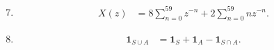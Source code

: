 \begin{enumerate}[label=\thesubsection.\arabic*, ref=\thesubsection.\theenumi, leftmargin=12mm, itemsep=4pt]
    \setcounter{enumi}{6}
    \item[\ref{question-short:C10-Q22}]
    \begin{align}
        X(z) &= 8\sum_{n=0}^{59} z^{-n}
        + 2\sum_{n=0}^{59} n z^{-n}.
        \label{formula:C10-Q22}
    \end{align}

    \setcounter{enumi}{7}
    \item[\ref{question-short:C10-Q28}]
    \begin{align}
        \mathbf 1_{S\cup A}
        &= \mathbf 1_S+\mathbf 1_A-\mathbf 1_{S\cap A}.
        \label{formula:C10-Q28}
    \end{align}


\end{enumerate}
